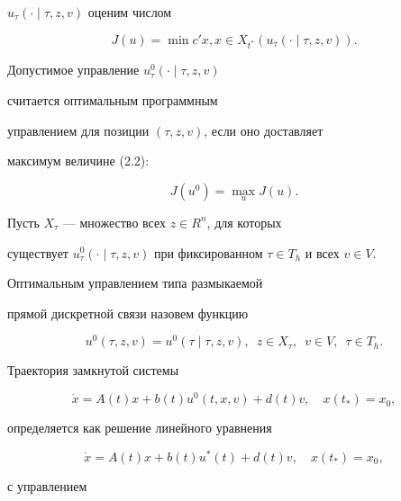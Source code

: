 $u_{\tau}(\cdot\mid\tau,z,v)$ оценим числом


\begin{equation}


J(u)=\min c'x, x \in X_{t^{*}}(u_{\tau}(\cdot\mid\tau,z,v)).


\end{equation}


Допустимое управление $u_{\tau}^{0}(\cdot\mid\tau,z,v)$


считается оптимальным программным


управлением для позиции $(\tau,z,v)$, если оно доставляет


максимум величине (2.2):


$$


J(u^0)=\max_{u}J(u).


$$


Пусть $X_{\tau}$ --- множество всех $z \in R^n$, для которых


существует $u^{0}_{\tau}(\cdot\mid\tau,z,v)$ при фиксированном $\tau


\in T_{h}$ и всех $v \in V$.





\begin{defns}


Оптимальным управлением типа размыкаемой


прямой дискретной связи назовем функцию


\begin{equation}


u^{0}(\tau,z,v)=u^{0}(\tau\mid\tau,z,v),\ \; z \in X_{\tau},\ \; v \in V,


\ \; \tau \in T_{h}.


\end{equation}


\end{defns}





Траектория замкнутой системы


$$


\Dot x=A(t)x+b(t)u^{0}(t,x,v)+d(t)v,\quad x(t_*)=x_{0},


$$


определяется как решение линейного уравнения


$$


\Dot x = A(t)x+b(t)u^{*}(t)+d(t)v,\quad x(t_{*})=x_0,


$$


с управлением



